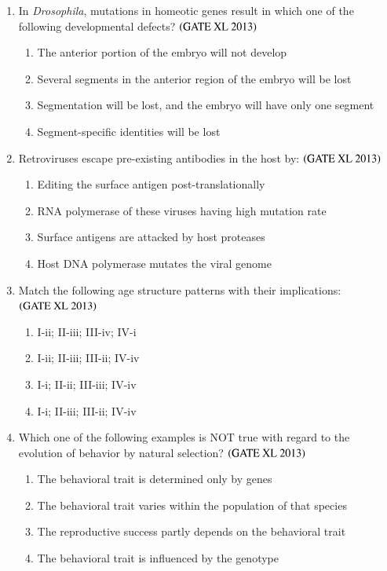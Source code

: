 \documentclass[journal]{IEEEtran}
\begin{document}
\begin{enumerate}
\item In \textit{Drosophila}, mutations in homeotic genes result in which one of the following developmental defects? \hfill $\left(\text{GATE XL 2013}\right)$
\begin{enumerate}
    \item The anterior portion of the embryo will not develop
    \item Several segments in the anterior region of the embryo will be lost
    \item Segmentation will be lost, and the embryo will have only one segment
    \item Segment-specific identities will be lost
\end{enumerate}

\item Retroviruses escape pre-existing antibodies in the host by: \hfill $\left(\text{GATE XL 2013}\right)$
\begin{enumerate}
    \item Editing the surface antigen post-translationally
    \item RNA polymerase of these viruses having high mutation rate
    \item Surface antigens are attacked by host proteases
    \item Host DNA polymerase mutates the viral genome
\end{enumerate}

\item Match the following age structure patterns with their implications: \hfill $\left(\text{GATE XL 2013}\right)$
\begin{enumerate}
    \item I-ii; II-iii; III-iv; IV-i
    \item I-ii; II-iii; III-ii; IV-iv
    \item I-i; II-ii; III-iii; IV-iv
    \item I-i; II-iii; III-ii; IV-iv
\end{enumerate}

\item Which one of the following examples is NOT true with regard to the evolution of behavior by natural selection? \hfill $\left(\text{GATE XL 2013}\right)$
\begin{enumerate}
    \item The behavioral trait is determined only by genes
    \item The behavioral trait varies within the population of that species
    \item The reproductive success partly depends on the behavioral trait
    \item The behavioral trait is influenced by the genotype
\end{enumerate}


\end{enumerate}
\end{document}
